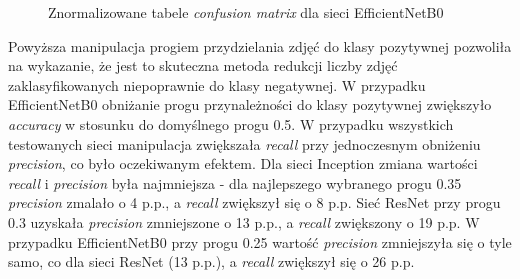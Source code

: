 \documentclass[polish,12pt]{aghthesis}
\begin{document}
\begin{figure}[h!]
    \begin{adjustbox}{minipage=1.0\paperwidth, pagecenter}
    \centering
    \qquad
    \end{adjustbox}
    \label{fig:effnetb0-softmax-matrices}
    \caption{Znormalizowane tabele \textit{confusion matrix} dla sieci EfficientNetB0}
    \label{table:13}
\end{figure}

\par Powyższa manipulacja progiem przydzielania zdjęć do klasy pozytywnej pozwoliła na wykazanie, że jest to skuteczna metoda redukcji liczby zdjęć zaklasyfikowanych niepoprawnie do klasy negatywnej. W przypadku EfficientNetB0 obniżanie progu przynależności do klasy pozytywnej zwiększyło \textit{accuracy} w stosunku do domyślnego progu 0.5. W przypadku wszystkich testowanych sieci manipulacja zwiększała \textit{recall} przy jednoczesnym obniżeniu \textit{precision}, co było oczekiwanym efektem. Dla sieci Inception zmiana wartości \textit{recall} i \textit{precision} była najmniejsza - dla najlepszego wybranego progu 0.35 \textit{precision} zmalało o 4 p.p., a \textit{recall} zwiększył się o 8 p.p. Sieć ResNet przy progu 0.3 uzyskała \textit{precision} zmniejszone o 13 p.p., a \textit{recall} zwiększony o 19 p.p. W przypadku EfficientNetB0 przy progu 0.25 wartość \textit{precision} zmniejszyła się o tyle samo, co dla sieci ResNet (13 p.p.), a \textit{recall} zwiększył się o 26 p.p. 
\end{document}
